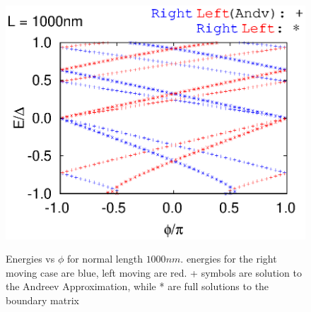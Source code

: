 \documentclass[a4paper,11pt]{article}
\begin{document}
\begin{figure}
  \begin{center}
    \includegraphics{levels_with_p_1000L.eps}
    \label{fig:}
    \caption{Energies vs $\phi$ for normal length $1000 nm$. energies for the right moving case are blue, left moving are red. + symbols are solution to the Andreev Approximation, while * are full solutions to the boundary matrix}
  \end{center}
\end{figure}
\end{document}
